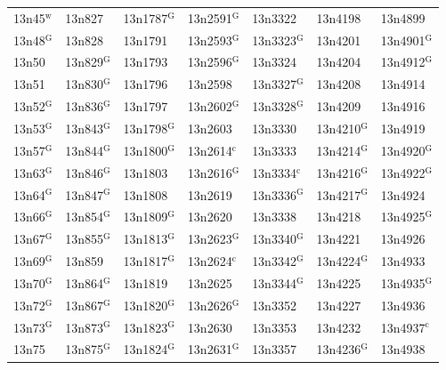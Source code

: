 \documentclass[12pt, oneside]{amsart}
\begin{document}
{\begin{longtable}{*{7}{>{\raggedright\arraybackslash}p{}}}
13n45$^{\mathrm{w}}$ & 13n827 & 13n1787$^{\mathrm{G}}$ & 13n2591$^{\mathrm{G}}$ & 13n3322 & 13n4198 & 13n4899 \\
13n48$^{\mathrm{G}}$ & 13n828 & 13n1791 & 13n2593$^{\mathrm{G}}$ & 13n3323$^{\mathrm{G}}$ & 13n4201 & 13n4901$^{\mathrm{G}}$ \\
13n50 & 13n829$^{\mathrm{G}}$ & 13n1793 & 13n2596$^{\mathrm{G}}$ & 13n3324 & 13n4204 & 13n4912$^{\mathrm{G}}$ \\
13n51 & 13n830$^{\mathrm{G}}$ & 13n1796 & 13n2598 & 13n3327$^{\mathrm{G}}$ & 13n4208 & 13n4914 \\
13n52$^{\mathrm{G}}$ & 13n836$^{\mathrm{G}}$ & 13n1797 & 13n2602$^{\mathrm{G}}$ & 13n3328$^{\mathrm{G}}$ & 13n4209 & 13n4916 \\
13n53$^{\mathrm{G}}$ & 13n843$^{\mathrm{G}}$ & 13n1798$^{\mathrm{G}}$ & 13n2603 & 13n3330 & 13n4210$^{\mathrm{G}}$ & 13n4919 \\
13n57$^{\mathrm{G}}$ & 13n844$^{\mathrm{G}}$ & 13n1800$^{\mathrm{G}}$ & 13n2614$^{\mathrm{c}}$ & 13n3333 & 13n4214$^{\mathrm{G}}$ & 13n4920$^{\mathrm{G}}$ \\
13n63$^{\mathrm{G}}$ & 13n846$^{\mathrm{G}}$ & 13n1803 & 13n2616$^{\mathrm{G}}$ & 13n3334$^{\mathrm{c}}$ & 13n4216$^{\mathrm{G}}$ & 13n4922$^{\mathrm{G}}$ \\
13n64$^{\mathrm{G}}$ & 13n847$^{\mathrm{G}}$ & 13n1808 & 13n2619 & 13n3336$^{\mathrm{G}}$ & 13n4217$^{\mathrm{G}}$ & 13n4924 \\
13n66$^{\mathrm{G}}$ & 13n854$^{\mathrm{G}}$ & 13n1809$^{\mathrm{G}}$ & 13n2620 & 13n3338 & 13n4218 & 13n4925$^{\mathrm{G}}$ \\
13n67$^{\mathrm{G}}$ & 13n855$^{\mathrm{G}}$ & 13n1813$^{\mathrm{G}}$ & 13n2623$^{\mathrm{G}}$ & 13n3340$^{\mathrm{G}}$ & 13n4221 & 13n4926 \\
13n69$^{\mathrm{G}}$ & 13n859 & 13n1817$^{\mathrm{G}}$ & 13n2624$^{\mathrm{c}}$ & 13n3342$^{\mathrm{G}}$ & 13n4224$^{\mathrm{G}}$ & 13n4933 \\
13n70$^{\mathrm{G}}$ & 13n864$^{\mathrm{G}}$ & 13n1819 & 13n2625 & 13n3344$^{\mathrm{G}}$ & 13n4225 & 13n4935$^{\mathrm{G}}$ \\
13n72$^{\mathrm{G}}$ & 13n867$^{\mathrm{G}}$ & 13n1820$^{\mathrm{G}}$ & 13n2626$^{\mathrm{G}}$ & 13n3352 & 13n4227 & 13n4936 \\
13n73$^{\mathrm{G}}$ & 13n873$^{\mathrm{G}}$ & 13n1823$^{\mathrm{G}}$ & 13n2630 & 13n3353 & 13n4232 & 13n4937$^{\mathrm{c}}$ \\
13n75 & 13n875$^{\mathrm{G}}$ & 13n1824$^{\mathrm{G}}$ & 13n2631$^{\mathrm{G}}$ & 13n3357 & 13n4236$^{\mathrm{G}}$ & 13n4938 \\

\end{longtable}}
\end{document}
